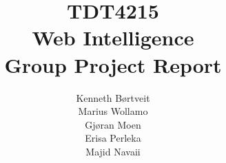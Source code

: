 \documentclass[a4paper, 11pt]{report}
\title{TDT4215 \\ Web Intelligence \\ Group Project Report}
\author{Kenneth Børtveit \\ Marius Wollamo \\ Gjøran Moen \\ Erisa Perleka \\ Majid Navaii}
\begin{document}
\maketitle
\pagebreak
\tableofcontents
\pagebreak









\end{document}
